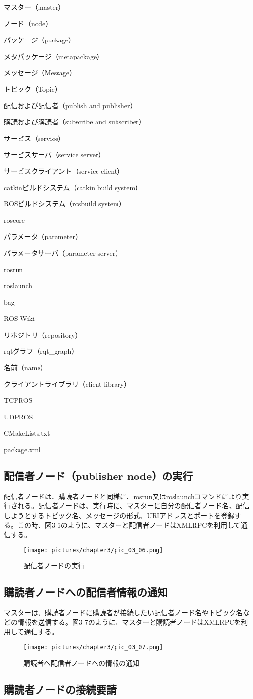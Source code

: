 \begin{term}{マスター（master）}
\begin{term}{ノード（node）}
\begin{term}{パッケージ（package）}
\begin{term}{メタパッケージ（metapackage）}
\begin{term}{メッセージ（Message）}
\begin{term}{トピック（Topic）}
\begin{term}{配信および配信者（publish and publisher）}
\begin{term}{購読および購読者（subscribe and subscriber）}
\begin{term}{サービス（service）}
\begin{term}{サービスサーバ（service server）}
\begin{term}{サービスクライアント（service client）}
\begin{term}{catkinビルドシステム（catkin build system）}
\begin{term}{ROSビルドシステム（rosbuild system）}
\begin{term}{roscore}
\begin{term}{パラメータ（parameter）}
\begin{term}{パラメータサーバ（parameter server）}
\begin{term}{rosrun}
\begin{term}{roslaunch}
\begin{term}{bag}
\begin{term}{ROS Wiki}
\begin{term}{リポジトリ（repository）}
\begin{term}{rqtグラフ（rqt\_graph）}
\begin{term}{名前（name）}
\begin{term}{クライアントライブラリ（client library）}
\begin{term}{TCPROS}
\begin{term}{UDPROS}
\begin{term}{CMakeLists.txt}
\begin{term}{package.xml}
\subsection{配信者ノード（publisher node）の実行}

配信者ノードは、購読者ノードと同様に、rosrun又はroslaunchコマンドにより実行される。配信者ノードは、実行時に、マスターに自分の配信者ノード名、配信しようとするトピック名、メッセージの形式、URIアドレスとポートを登録する。この時、図3-6のように、マスターと配信者ノードはXMLRPCを利用して通信する。

\begin{figure}[h]
  \centering
  \texttt{[image: pictures/chapter3/pic\_03\_06.png]}
  \caption{配信者ノードの実行}
\end{figure}

\subsection{購読者ノードへの配信者情報の通知}

マスターは、購読者ノードに購読者が接続したい配信者ノード名やトピック名などの情報を送信する。図3-7のように、マスターと購読者ノードはXMLRPCを利用して通信する。

\begin{figure}[h]
  \centering
  \texttt{[image: pictures/chapter3/pic\_03\_07.png]}
  \caption{購読者へ配信者ノードへの情報の通知}
\end{figure}

\subsection{購読者ノードの接続要請}


\end{term}
\end{term}
\end{term}
\end{term}
\end{term}
\end{term}
\end{term}
\end{term}
\end{term}
\end{term}
\end{term}
\end{term}
\end{term}
\end{term}
\end{term}
\end{term}
\end{term}
\end{term}
\end{term}
\end{term}
\end{term}
\end{term}
\end{term}
\end{term}
\end{term}
\end{term}
\end{term}
\end{term}
